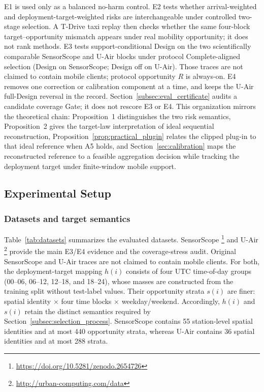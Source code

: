 \documentclass[letterpaper,journal]{IEEEtran}
\begin{document}
E1 is used only as a balanced no-harm control.  E2 tests whether
arrival-weighted and deployment-target-weighted risks are interchangeable
under controlled two-stage selection.  A T-Drive taxi replay then checks
whether the same four-block target--opportunity mismatch appears under
real mobility opportunity; it does not rank methods.  E3 tests
support-conditional Design on the two scientifically comparable
SensorScope and U-Air blocks under protocol Complete-aligned selection
(Design on SensorScope; Design off on U-Air).  Those traces are not claimed
to contain mobile clients; protocol opportunity $R$ is always-on.  E4
removes one correction or calibration component at a time, and keeps
the U-Air full-Design reversal in the record.  Section~\ref{subsec:eval_certificate}
audits a candidate coverage Gate; it does not rescore E3 or E4.
This organization mirrors the
theoretical chain: Proposition~1 distinguishes the two risk semantics,
Proposition~2 gives the target-law interpretation of ideal sequential
reconstruction, Proposition~\ref{prop:practical_plugin} relates the
clipped plug-in to that ideal reference when A5 holds, and
Section~\ref{sec:calibration} maps the reconstructed reference to a feasible
aggregation decision while tracking the deployment target under finite-window
mobile support.

\subsection{Experimental Setup}
\label{subsec:eval_setup}

\subsubsection{Datasets and target semantics}

Table~\ref{tab:datasets} summarizes the evaluated datasets.  SensorScope
\cite{ingelrest2010sensorscope,barrenetxea2019sensorscope}\footnote{\url{https://doi.org/10.5281/zenodo.2654726}}
and U-Air
\cite{zheng2013uair}\footnote{\url{http://urban-computing.com/data}}
provide the main E3/E4 evidence and the coverage-stress audit.
Original SensorScope and U-Air traces are not claimed to contain mobile
clients.  For both, the deployment-target mapping
$h(i)$ consists of four UTC time-of-day groups
(00--06, 06--12, 12--18, and 18--24), whose masses are constructed from the training
split without test-label values.  Their opportunity strata $s(i)$ are finer:
spatial identity $\times$ four time blocks $\times$ weekday/weekend.
Accordingly, $h(i)$ and $s(i)$ retain the distinct semantics required by
Section~\ref{subsec:selection_process}.  SensorScope contains 55 station-level
spatial identities and at most 440 opportunity strata, whereas U-Air contains
36 spatial identities and at most 288 strata.
\end{document}

